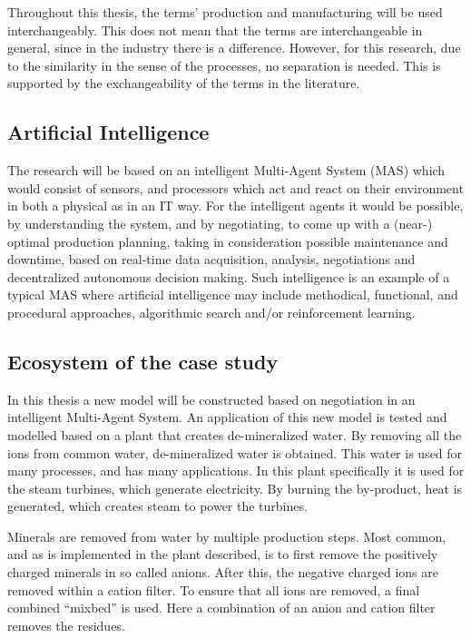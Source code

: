 Throughout this thesis, the terms' production and manufacturing will be used interchangeably. This does not mean that the terms are interchangeable in general, since in the industry there is a difference. However, for this research, due to the similarity in the sense of the processes, no separation is needed. This is supported by the exchangeability of the terms in the literature. 

\subsection{Artificial Intelligence}
The research will be based on an intelligent Multi-Agent System (MAS) which would consist of sensors, and processors which act and react on their environment in both a physical as in an IT way. For the intelligent agents it would be possible, by understanding the system, and by negotiating, to come up with a (near-) optimal production planning, taking in consideration possible maintenance and downtime, based on real-time data acquisition, analysis, negotiations and decentralized autonomous decision making. Such intelligence is an example of a typical MAS where artificial intelligence may include methodical, functional, and procedural approaches, algorithmic search and/or reinforcement learning. 

\subsection{Ecosystem of the case study}
\label{sec:intro_ecosystem}
In this thesis a new model will be constructed based on negotiation in an intelligent Multi-Agent System. An application of this new model is tested and modelled based on a plant that creates de-mineralized water. By removing all the ions from common water, de-mineralized water is obtained. This water is used for many processes, and has many applications. In this plant specifically it is used for the steam turbines, which generate electricity. By burning the by-product, heat is generated, which creates steam to power the turbines. 

Minerals are removed from water by multiple production steps. Most common, and as is implemented in the plant described, is to first remove the positively charged minerals in so called anions. After this, the negative charged ions are removed within a cation filter. To ensure that all ions are removed, a final combined ``mixbed'' is used. Here a combination of an anion and cation filter removes the residues.

